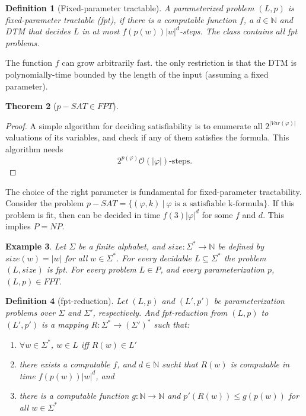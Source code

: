 \documentclass{report}
\newcommand{\NP}{\text{$\mathit{NP}$}\xspace}
\newcommand{\Po}{\text{$\mathit{P}$}\xspace}
\newcommand{\bigO}{\text{$\mathcal{O}$}\xspace}
\newcommand{\FPT}{\text{$\mathit{FPT}$}\xspace}
\newcommand{\pSAT}{\text{$\mathit{p\!-\!SAT}$}\xspace}
\newcommand{\threeSAT}{\text{$\mathit{3\!SAT}$}\xspace}
\newtheorem{definition}{Definition}[chapter]
\newtheorem{example}[definition]{Example}
\newtheorem{theorem}[definition]{Theorem}
\begin{document}
\begin{definition}[Fixed-parameter tractable]
A parameterized problem $(L,p)$ is fixed-parameter tractable (fpt), if there is a computable function $f$, a $d \in \mathbb{N}$ and DTM that decides $L$ in at most $f(p(w))|w|^d$-steps. The class \FPT  contains all fpt problems.
\end{definition}
The function $f$ can grow arbitrarily fast. the only restriction is that the DTM is polynomially-time bounded by the length of the input (assuming a fixed parameter).

\begin{theorem}[$\pSAT \in \FPT$]
\end{theorem}

\begin{proof}A simple algorithm for deciding satisfiability is to enumerate all $2^{|Var(\varphi)|}$ valuations of its variables, and check if any of them satisfies the formula. This algorithm needs
\[ 2^{p(\varphi)}\bigO(|\varphi|)\text{-steps.}\]
\end{proof}\noindent
The choice of the right parameter is fundamental for fixed-parameter tractability. Consider the problem  $\pSAT = \{(\varphi,k)\ |\ \varphi\text{ is a satisfiable k-formula}\}$. If this problem is fit, then \threeSAT can be decided in time $f(3)|\varphi|^d$ for some $f$ and $d$. This implies $\Po = \NP$.

\begin{example}Let $\Sigma$ be a finite alphabet, and $size: \Sigma^* \rightarrow \mathbb{N}$ be defined by $size(w) = |w|$ for all $w \in \Sigma^*$. For every decidable $L\subseteq \Sigma^*$ the problem $(L,size)$ is fpt. For every problem $L \in P$, and every parameterization $p$, $(L,p) \in \FPT$.
\end{example}

\begin{definition}[fpt-reduction] Let $(L,p)$ and $(L',p')$ be parameterization problems over $\Sigma$ and $\Sigma'$, respectively. And fpt-reduction from $(L,p)$ to $(L',p')$ is a mapping $R: \Sigma^* \rightarrow (\Sigma')^*$ such that:
\begin{enumerate}
\item $\forall w \in \Sigma^*$, $w \in L$ iff $R(w) \in L'$
\item there exists a computable $f$, and $d \in \mathbb{N}$ sucht that $R(w)$ is computable in time $f(p(w))|w|^d$, and 
\item there is a computable function $g: \mathbb{N} \rightarrow \mathbb{N}$ and $p'(R(w)) \leq g(p(w))$ for all $w \in \Sigma^*$
\end{enumerate}
\end{definition}
\end{document}

